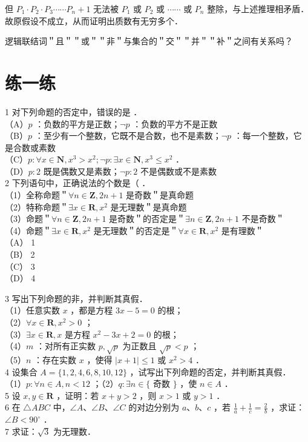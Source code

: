 \documentclass[10pt]{article}
\begin{document}
但 \(P_{1} \cdot P_{2} \cdot P_{3} \cdots \cdots P_{n}+1\) 无法被 \(P_{1}\) 或 \(P_{2}\) 或 \(\cdots \cdots\) 或 \(P_{n}\) 整除，与上述推理相矛盾．\\
故原假设不成立，从而证明出质数有无穷多个．

逻辑联结词＂且＂＂或＂＂非＂与集合的＂交＂＂并＂＂补＂之间有关系吗？

\section*{练一练}
1 对下列命题的否定中，错误的是 ．\\
（A）\(p\) ：负数的平方是正数；\(\neg p\) ：负数的平方不是正数\\
（B）\(p\) ：至少有一个整数，它既不是合数，也不是素数；\(\neg p\) ：每一个整数，它是合数或素数\\
（C）\(p: \forall x \in \mathbf{N}, x^{3}>x^{2} ; \neg p: \exists x \in \mathbf{N}, x^{3} \leqslant x^{2}\) ．\\
（D）\(p: 2\) 既是偶数又是素数；\(\neg p: 2\) 不是偶数或不是素数\\
2 下列语句中，正确说法的个数是（ ．\\
（1）全称命题＂\(\forall n \in \mathbf{Z}, 2 n+1\) 是奇数＂是真命题\\
（2）特称命题＂\(\exists x \in \mathbf{R}, x^{2}\) 是无理数＂是真命题\\
（3）命题＂\(\forall n \in \mathbf{Z}, 2 n+1\) 是奇数＂的否定是＂\(\exists n \in \mathbf{Z}, 2 n+1\) 不是奇数＂\\
（4）命题＂\(\exists x \in \mathbf{R}, x^{2}\) 是无理数＂的否定是＂\(\forall x \in \mathbf{R}, x^{2}\) 是有理数＂\\
（A） 1\\
（B） 2\\
（C） 3\\
（D） 4

3 写出下列命题的非，并判断其真假．\\
（1）任意实数 \(x\) ，都是方程 \(3 x-5=0\) 的根；\\
（2）\(\forall x \in \mathbf{R}, x^{2}>0\) ；\\
（3）\(\exists x \in \mathbf{R}, x\) 是方程 \(x^{2}-3 x+2=0\) 的根；\\
（4）\(m\) ：对所有正实数 \(p, \sqrt{p}\) 为正数且 \(\sqrt{p}<p\) ；\\
（5）\(n\) ：存在实数 \(x\) ，使得 \(|x+1| \leqslant 1\) 或 \(x^{2}>4\) ．\\
4 设集合 \(A=\{1,2,4,6,8,10,12\}\) ，试写出下列命题的否定，并判断其真假．\\
（1）\(p: \forall n \in A, n<12\) ；（2）\(q: \exists n \in\{\) 奇数 \(\}\) ，使 \(n \in A\) ．\\
5 设 \(x, y \in \mathbf{R}\) ，证明：若 \(x+y>2\) ，则 \(x>1\) 或 \(y>1\) ．\\
6 在 \(\triangle A B C\) 中，\(\angle A 、 \angle B 、 \angle C\) 的对边分别为 \(a 、 b 、 c\) ，若 \(\frac{1}{a}+\frac{1}{c}=\frac{2}{b}\) ，求证：\(\angle B<90^{\circ}\) ．\\
7 求证：\(\sqrt{3}\) 为无理数．
\end{document}
